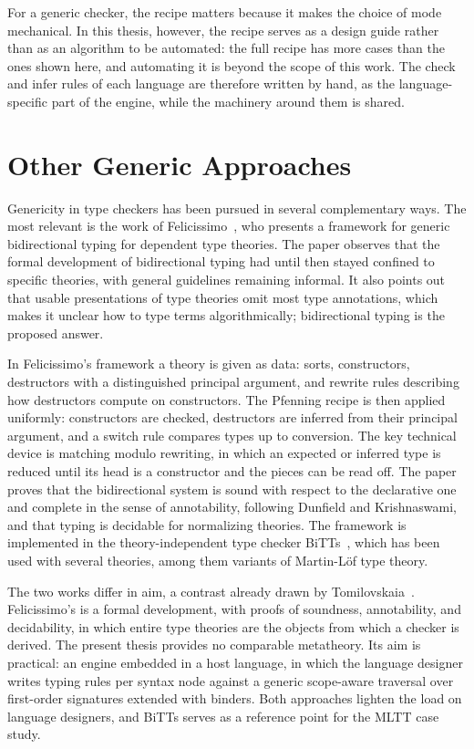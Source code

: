 For a generic checker, the recipe matters because it makes the choice of mode mechanical. In this thesis, however, the recipe serves as a design guide rather than as an algorithm to be automated: the full recipe has more cases than the ones shown here, and automating it is beyond the scope of this work. The check and infer rules of each language are therefore written by hand, as the language-specific part of the engine, while the machinery around them is shared.

\section{Other Generic Approaches}
\label{sec:lr-other}

Genericity in type checkers has been pursued in several complementary ways. The most relevant is the work of Felicissimo~\cite{felicissimo2023generic}, who presents a framework for generic bidirectional typing for dependent type theories. The paper observes that the formal development of bidirectional typing had until then stayed confined to specific theories, with general guidelines remaining informal. It also points out that usable presentations of type theories omit most type annotations, which makes it unclear how to type terms algorithmically; bidirectional typing is the proposed answer.

In Felicissimo's framework a theory is given as data: sorts, constructors, destructors with a distinguished principal argument, and rewrite rules describing how destructors compute on constructors. The Pfenning recipe is then applied uniformly: constructors are checked, destructors are inferred from their principal argument, and a switch rule compares types up to conversion. The key technical device is matching modulo rewriting, in which an expected or inferred type is reduced until its head is a constructor and the pieces can be read off. The paper proves that the bidirectional system is sound with respect to the declarative one and complete in the sense of annotability, following Dunfield and Krishnaswami, and that typing is decidable for normalizing theories. The framework is implemented in the theory-independent type checker BiTTs~\cite{bitts}, which has been used with several theories, among them variants of Martin-L\"of type theory.

The two works differ in aim, a contrast already drawn by Tomilovskaia~\cite[Sec.~2.6]{tomilovskaia2025bidir}. Felicissimo's is a formal development, with proofs of soundness, annotability, and decidability, in which entire type theories are the objects from which a checker is derived. The present thesis provides no comparable metatheory. Its aim is practical: an engine embedded in a host language, in which the language designer writes typing rules per syntax node against a generic scope-aware traversal over first-order signatures extended with binders. Both approaches lighten the load on language designers, and BiTTs serves as a reference point for the MLTT case study.

